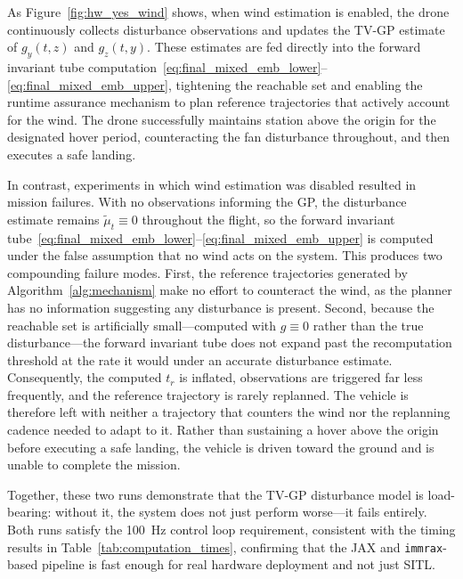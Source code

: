 \documentclass{IEEEojcsys}
\begin{document}
As Figure~\ref{fig:hw_yes_wind} shows, when wind estimation is enabled, the drone continuously collects disturbance observations and updates the TV-GP estimate of $g_y(t,z)$ and $g_z(t,y)$. These estimates are fed directly into the forward invariant tube computation~\eqref{eq:final_mixed_emb_lower}--\eqref{eq:final_mixed_emb_upper}, tightening the reachable set and enabling the runtime assurance mechanism to plan reference trajectories that actively account for the wind. The drone successfully maintains station above the origin for the designated hover period, counteracting the fan disturbance throughout, and then executes a safe landing.

In contrast, experiments in which wind estimation was disabled resulted in mission failures. With no observations informing the \ac{GP}, the disturbance estimate remains $\widetilde{\mu}_t \equiv 0$ throughout the flight, so the forward invariant tube~\eqref{eq:final_mixed_emb_lower}--\eqref{eq:final_mixed_emb_upper} is computed under the false assumption that no wind acts on the system. This produces two compounding failure modes. First, the reference trajectories generated by Algorithm~\ref{alg:mechanism} make no effort to counteract the wind, as the planner has no information suggesting any disturbance is present. Second, because the reachable set is artificially small—computed with $g \equiv 0$ rather than the true disturbance—the forward invariant tube does not expand past the recomputation threshold at the rate it would under an accurate disturbance estimate. Consequently, the computed $t_r$ is inflated, observations are triggered far less frequently, and the reference trajectory is rarely replanned. The vehicle is therefore left with neither a trajectory that counters the wind nor the replanning cadence needed to adapt to it. Rather than sustaining a hover above the origin before executing a safe landing, the vehicle is driven toward the ground and is unable to complete the mission.

Together, these two runs demonstrate that the TV-GP disturbance model is load-bearing: without it, the system does not just perform worse—it fails entirely. Both runs satisfy the \qty{100}{Hz} control loop requirement, consistent with the timing results in Table~\ref{tab:computation_times}, confirming that the JAX and \texttt{immrax}-based pipeline is fast enough for real hardware deployment and not just SITL.
\end{document}
